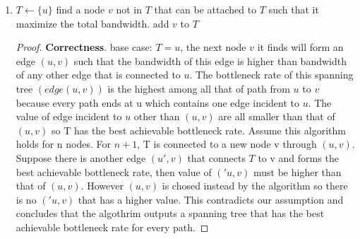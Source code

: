 \documentclass[paper=a4, fontsize=11pt]{scrartcl} %
\numberwithin{equation}{section} %
\numberwithin{figure}{section} %
\numberwithin{table}{section} %
\newenvironment{myproof}{\begin{proof}\setlength{\parindent}{2em}}{\end{proof}}
\begin{document}
\begin{enumerate}
\begin{enumerate}
\begin{myproof}
\textbf{Runtime}. Since each process is examined once(which use constant time), it's either be eliminated in a search or it's the start process of a new search. Thus, the runtime is $O(n)$.
\end{myproof} 
\item
Ture.
\begin{myproof}
Since the $k^*$ processes are disjoint, if we call status\_ check $k^*-1$ times, there will be one process missed, that contradicts the assumption.

$k^*$ is also the optimal solution. Suppose k > $k^*$ is the optimal solution, then at least one of the conflicting groups gets at least two status\_ check. However, for each conflicting group, only one status\_ check is required to finish the job. This contradicts the assumption that k is the optimal solution.
\end{myproof}
\end{enumerate}
\item %
\begin{algorithm}
\begin{algorithmic}
\STATE $T \leftarrow \{ u\}$
	\STATE find a  node $v$ not in $T$ that can be attached to $T$ such that it maximize the total bandwidth.
	\STATE add $v$ to $T$
\ENDWHILE
\end{algorithmic}
\end{algorithm}
\begin{myproof}
\textbf{Correctness}.
base case: $T = {u}$, the next node $v$ it finds will form an edge $(u,v)$ such that the 
bandwidth of this edge is higher than bandwidth of any other edge that is connected to $u$.
The bottleneck rate of this spanning tree $(edge (u,v))$ is the highest among all that of path from
$u$ to $v$ because every path ends at u which contains one edge incident to $u$. The value of edge incident to $u$
other than $(u,v)$ are all smaller than that of $(u,v)$ so T has the best achievable bottleneck rate.
Assume this algorithm holds for n nodes. For $n + 1$, T is connected to a new node v through $(u,v)$. Suppose there
is another edge $(u',v)$ that connects $T$ to v and forms the best achievable bottleneck rate, then value of $('u,v)$ must
be higher than that of $(u,v)$. However $(u,v)$ is chosed instead by the algorithm so there is no $('u, v)$ that has a higher value. This contradicts our assumption and concludes that the algothrim outputs a spanning tree that has the best achievable bottleneck rate for every path.  


\end{myproof}
\end{enumerate}
\end{document}
